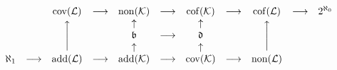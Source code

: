 \documentclass[12pt]{article}
\begin{document}
${ \displaystyle
\begin{array}{ccccccccccc}
                        &                 & {\rm cov}({\mathcal L}) & \longrightarrow &
{\rm non}({\mathcal K}) & \longrightarrow & {\rm cof}({\mathcal K}) & \longrightarrow &
{\rm cof}({\mathcal L}) & \longrightarrow & 2^{\aleph_0} \\

                        &                 & \multirow{3}{*}{\Bigg\uparrow} &          &
\uparrow                &                 & \uparrow                &                 &
\multirow{3}{*}{\Bigg\uparrow} &          & \\

                        &                 &                         &                 &
{\mathfrak b}           & \longrightarrow & {\mathfrak d}           &                 &
                        &                 & \\

                        &                 &                         &                 &
\uparrow                &                 & \uparrow                &                 &
                        &                 & \\

\aleph_1                & \longrightarrow & {\rm add}({\mathcal L}) & \longrightarrow &
{\rm add}({\mathcal K}) & \longrightarrow & {\rm cov}({\mathcal K}) & \longrightarrow &
{\rm non}({\mathcal L}) &                 &
\end{array}
}$
\end{document}
